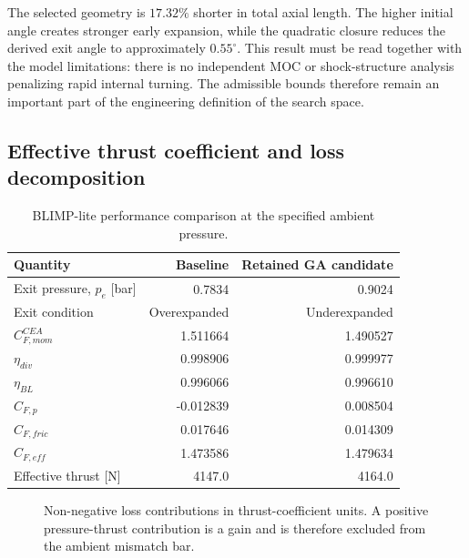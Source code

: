 The selected geometry is \(17.32\%\) shorter in total axial length. The higher
initial angle creates stronger early expansion, while the quadratic closure reduces
the derived exit angle to approximately \(0.55^\circ\). This result must be read
together with the model limitations: there is no independent MOC or shock-structure
analysis penalizing rapid internal turning. The admissible bounds therefore remain an
important part of the engineering definition of the search space.

\subsection{Effective thrust coefficient and loss decomposition}

\begin{table}[H]
\centering
\caption{BLIMP-lite performance comparison at the specified ambient pressure.}
\label{tab:performance_comparison}
\begin{tabular}{lrr}
\toprule
Quantity & Baseline & Retained GA candidate \\
\midrule
Exit pressure, \(p_e\) [bar] & 0.7834 & 0.9024 \\
Exit condition & Overexpanded & Underexpanded \\
\(C_{F,mom}^{CEA}\) & 1.511664 & 1.490527 \\
\(\eta_{div}\) & 0.998906 & 0.999977 \\
\(\eta_{BL}\) & 0.996066 & 0.996610 \\
\(C_{F,p}\) & -0.012839 & 0.008504 \\
\(C_{F,fric}\) & 0.017646 & 0.014309 \\
\(C_{F,eff}\) & 1.473586 & 1.479634 \\
Effective thrust [N] & 4147.0 & 4164.0 \\
\bottomrule
\end{tabular}
\end{table}

\begin{figure}[H]
\centering
{}
\caption{Non-negative loss contributions in thrust-coefficient units. A positive
pressure-thrust contribution is a gain and is therefore excluded from the ambient
mismatch bar.}
\label{fig:loss_breakdown_comparison}
\end{figure}

